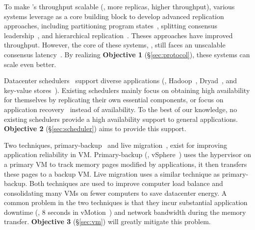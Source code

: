 To make \paxos's throughput scalable (\ie, more replicas, higher throughput), 
various systems leverage \paxos as a core building block to develop advanced 
replication approaches, including partitioning program 
states~\cite{scatter:sosp11,ssmr:dsn14}, splitting consensus 
leadership~\cite{mencius:osdi08,spaxos:srds12}, and hierarchical 
replication~\cite{manos:hotdep10,scatter:sosp11}. Theses approaches have 
improved throughput. However, the core of these systems, 
\paxos, still faces an unscalable consensus 
latency~\cite{ellis:thesis,scatter:sosp11,manos:hotdep10}. By realizing 
\textbf{Objective 1} (\S\ref{sec:protocol}), these systems can scale even 
better.

 Datacenter
schedulers~\cite{borg:eurosys15,mesos:nsdi11,tupperware,yarn:socc13,
autopilot:sosp07,quincy:sosp09,apollo:osdi14,fuxi:vldb14} support diverse 
applications (\eg, Hadoop~\cite{hadoop}, Dryad~\cite{dryad}, and key-value 
stores~\cite{redis}). Existing schedulers mainly focus on obtaining high 
availability for themselves by replicating their own essential components, or 
focus on application recovery~\cite{fuxi:vldb14} instead of availability. 
To the best of our knowledge, no existing schedulers provide a
high availability support to general applications. \textbf{Objective 2} 
(\S\ref{sec:scheduler}) aims to provide this support.

 Two 
techniques, primary-backup~\cite{remus:nsdi08,ftvm} and live 
migration~\cite{vmotion:atc05,xen:migration:nsdi05}, exist for improving 
application reliability in VM. Primary-backup (\eg, vSphere~\cite{ftvm})
uses the hypervisor on a primary VM to track memory pages modified by 
applications, it then transfers these pages to a backup VM. Live migration 
uses a similar technique as primary-backup. Both techniques are used to improve 
computer load balance and consolidating many VMs on fewer computers to save 
datacenter energy. A common problem in the two techniques is that they incur 
substantial application downtime (\eg, 8 seconds in 
vMotion~\cite{vmotion:atc05}) and network bandwidth during the memory transfer. 
\textbf{Objective 3} (\S\ref{sec:vm}) will greatly mitigate this problem.



